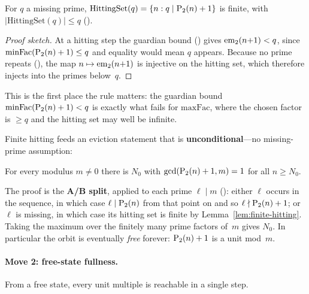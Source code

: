 \begin{lemma}
\label{lem:finite-hitting}
For $q$ a missing prime, $\mathrm{HittingSet}(q) = \{n : q \mid
\mathrm{P}_{2}(n)+1\}$ is finite, with
$|\mathrm{HittingSet}(q)| \leq q$
().
\end{lemma}

\begin{proof}[Proof sketch]
At a hitting step the guardian bound
()
gives $\mathrm{em}_{2}(n{+}1) < q$, since $\mathrm{minFac}(\mathrm{P}_{2}(n)+1) \le q$ and
equality would mean $q$ appears.  Because no prime repeats
(), the map
$n \mapsto \mathrm{em}_{2}(n{+}1)$ is injective on the hitting set, which
therefore injects into the primes below~$q$.
\end{proof}

\noindent
This is the first place the rule matters: the guardian bound
$\mathrm{minFac}(\mathrm{P}_{2}(n)+1) < q$ is exactly what fails for
$\mathrm{maxFac}$, where the chosen factor is $\geq q$ and the hitting
set may well be infinite.

Finite hitting feeds an eviction statement that is
\textbf{unconditional}---no missing-prime assumption:

\begin{lemma}
\label{lem:eviction}
For every modulus $m \neq 0$ there is $N_0$ with
$\gcd(\mathrm{P}_{2}(n)+1, m) = 1$ for all $n \geq N_0$.
\end{lemma}

\noindent
The proof is the \textbf{A/B split}, applied to each prime $\ell \mid m$
():
either $\ell$ occurs in the sequence, in which case $\ell \mid
\mathrm{P}_{2}(n)$ from that point on and so $\ell \nmid \mathrm{P}_{2}(n)+1$; or
$\ell$ is missing, in which case its hitting set is finite by
Lemma~\ref{lem:finite-hitting}.  Taking the maximum over the finitely
many prime factors of~$m$ gives $N_0$.  In particular the orbit is
eventually \emph{free} forever: $\mathrm{P}_{2}(n)+1$ is a unit mod~$m$.

\paragraph{Move 2: free-state fullness.}
From a free state, every unit multiple is reachable in a single step.

